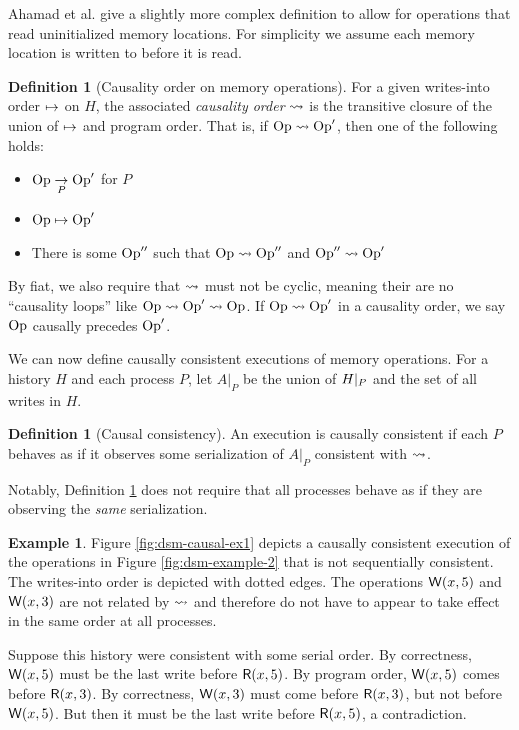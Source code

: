 \documentclass[]             %
{NASA}                       %
\theoremstyle{definition}
\newtheorem{example}[theorem]{Example}
\newtheorem{definition}[theorem]{Definition}
\begin{document}
  Ahamad et al. \cite{1995:causal-memory} give a slightly more complex
  definition to allow for operations that read uninitialized memory
  locations. For simplicity we assume each memory location is written
  to before it is read.

\begin{definition}[Causality order on memory operations]
  \label{def:memorycausalprecedence}
  For a given writes-into order $\mapsto$ on
  $H$, the associated \emph{causality order}
  $\rightsquigarrow$ is the transitive closure of the union of
  $\mapsto$ and program order. That is, if $\mathrm{Op} \rightsquigarrow
  \mathrm{Op}'$, then one of the following holds:
  \begin{itemize}
  \item $\mathrm{Op} \underset{P}{\to} \mathrm{Op}'$ for $P$
  \item $\mathrm{Op} \mapsto \mathrm{Op}'$
  \item There is some $\mathrm{Op}''$ such that $\mathrm{Op} \rightsquigarrow \mathrm{Op}''$ and $\mathrm{Op}'' \rightsquigarrow \mathrm{Op}'$
  \end{itemize}
  By fiat, we also require that $\rightsquigarrow$ must not be cyclic,
  meaning their are no ``causality loops'' like
  $\mathrm{Op} \rightsquigarrow \mathrm{Op}' \rightsquigarrow \mathrm{Op}$.  If
  $\mathrm{Op} \rightsquigarrow \mathrm{Op}'$ in a causality order, we say $\mathrm{Op}$
  causally precedes $\mathrm{Op}'$.
\end{definition}

We can now define causally consistent executions of memory
operations. For a history $H$ and each process $P$, let $A|_{P}$ be
the union of $H|_{P}$ and the set of all writes in $H$.

\begin{definition}[Causal consistency]
  \label{def:causalconsistency}
  An execution is causally consistent if each $P$ behaves as if it
  observes some serialization of $A|_{P}$ consistent with $\rightsquigarrow$.
\end{definition}

Notably, Definition \ref{def:causalconsistency} does not require that
all processes behave as if they are observing the \emph{same}
serialization.

\begin{example}
  \label{ex:dsm-causal-ex1}
  Figure \ref{fig:dsm-causal-ex1} depicts a causally consistent
  execution of the operations in Figure \ref{fig:dsm-example-2} that
  is not sequentially consistent. The writes-into order is depicted
  with dotted edges. The operations $\mathsf{W}\!\left(x, 5\right)$ and
  $\mathsf{W}\!\left(x, 3\right)$ are not related by $\rightsquigarrow$ and therefore
  do not have to appear to take effect in the same order at all processes.

  Suppose this history were consistent with some serial order. By
  correctness, $\mathsf{W}\!\left(x, 5\right)$ must be the last write before
  $\mathsf{R}\!\left(x, 5\right)$. By program order, $\mathsf{W}\!\left(x, 5\right)$ comes
  before $\mathsf{R}\!\left(x, 3\right)$. By correctness, $\mathsf{W}\!\left(x, 3\right)$ must
  come before $\mathsf{R}\!\left(x, 3\right)$, but not before
  $\mathsf{W}\!\left(x, 5\right)$. But then it must be the last write before
  $\mathsf{R}\!\left(x, 5\right)$, a contradiction.
\end{example}
\end{document}
